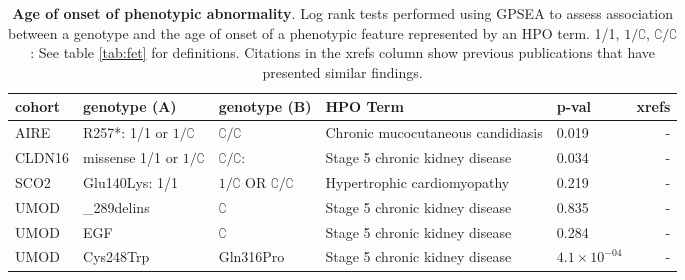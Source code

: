 \begin{table}
\centering
\begin{tabular}{l>{\raggedright\arraybackslash}p{3.5cm}>{\raggedright\arraybackslash}p{2.5cm}>{\raggedright\arraybackslash}p{4cm}lr}
\toprule
\textbf{cohort} & \textbf{genotype (A)} & \textbf{genotype (B)} & \textbf{HPO Term} & \textbf{p-val} & \textbf{xrefs}\\
\midrule
AIRE & R257*: 1/1 or $1/\complement$ &  $\complement/\complement$ & Chronic mucocutaneous candidiasis & 0.019 & -\\
CLDN16 & missense 1/1 or $1/\complement$ & $\complement/\complement$: & Stage 5 chronic kidney disease & 0.034 & -\\
SCO2 & Glu140Lys: 1/1 &  $1/\complement$ OR $\complement/\complement$ & Hypertrophic cardiomyopathy & 0.219 & -\\
UMOD & 278\_289delins & $\complement$ & Stage 5 chronic kidney disease & 0.835 & -\\
UMOD & EGF & $\complement$ & Stage 5 chronic kidney disease & 0.284 & -\\
UMOD & Cys248Trp & Gln316Pro & Stage 5 chronic kidney disease & $4.1 \times 10^{-04}$ & -\\
\bottomrule
\end{tabular}
\caption{\textbf{Age of onset of phenotypic abnormality}. Log rank tests performed using GPSEA to assess association between a genotype and the 
age of onset of a phenotypic feature represented by an HPO term.  1/1, $1/\complement$, $\complement/\complement$: See table \ref{tab:fet} for definitions. Citations in the xrefs column show previous publications that have presented similar findings.}
\label{tab:hpo_onset}
\end{table}
\clearpage
\newpage



